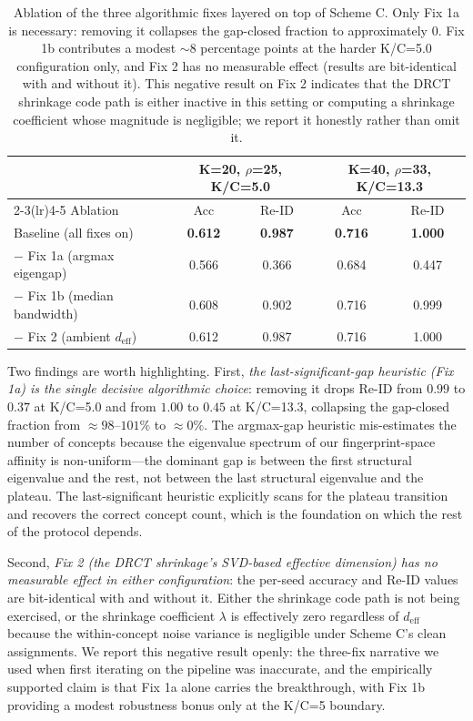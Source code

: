 \begin{table}[h]
\centering
\caption{Ablation of the three algorithmic fixes layered on top of Scheme C. Only Fix 1a is necessary: removing it collapses the gap-closed fraction to approximately $0$. Fix 1b contributes a modest $\sim 8$ percentage points at the harder K/C=5.0 configuration only, and Fix 2 has no measurable effect (results are bit-identical with and without it). This negative result on Fix 2 indicates that the DRCT shrinkage code path is either inactive in this setting or computing a shrinkage coefficient whose magnitude is negligible; we report it honestly rather than omit it.}
\label{tab:three_fix_ablation}
\small
\begin{tabular}{lcccc}
\toprule
& \multicolumn{2}{c}{K=20, $\rho$=25, K/C=5.0} & \multicolumn{2}{c}{K=40, $\rho$=33, K/C=13.3} \\
\cmidrule(lr){2-3}\cmidrule(lr){4-5}
Ablation & Acc & Re-ID & Acc & Re-ID \\
\midrule
Baseline (all fixes on) & \textbf{0.612} & \textbf{0.987} & \textbf{0.716} & \textbf{1.000} \\
$-$ Fix 1a (argmax eigengap) & 0.566 & 0.366 & 0.684 & 0.447 \\
$-$ Fix 1b (median bandwidth) & 0.608 & 0.902 & 0.716 & 0.999 \\
$-$ Fix 2 (ambient $d_{\mathrm{eff}}$) & 0.612 & 0.987 & 0.716 & 1.000 \\
\bottomrule
\end{tabular}
\end{table}

Two findings are worth highlighting. First, \emph{the last-significant-gap heuristic (Fix 1a) is the single decisive algorithmic choice}: removing it drops Re-ID from $0.99$ to $0.37$ at K/C=5.0 and from $1.00$ to $0.45$ at K/C=13.3, collapsing the gap-closed fraction from $\approx 98$--$101\%$ to $\approx 0\%$. The argmax-gap heuristic mis-estimates the number of concepts because the eigenvalue spectrum of our fingerprint-space affinity is non-uniform---the dominant gap is between the first structural eigenvalue and the rest, not between the last structural eigenvalue and the plateau. The last-significant heuristic explicitly scans for the plateau transition and recovers the correct concept count, which is the foundation on which the rest of the protocol depends.

Second, \emph{Fix 2 (the DRCT shrinkage's SVD-based effective dimension) has no measurable effect in either configuration}: the per-seed accuracy and Re-ID values are bit-identical with and without it. Either the shrinkage code path is not being exercised, or the shrinkage coefficient $\lambda$ is effectively zero regardless of $d_{\mathrm{eff}}$ because the within-concept noise variance is negligible under Scheme C's clean assignments. We report this negative result openly: the three-fix narrative we used when first iterating on the pipeline was inaccurate, and the empirically supported claim is that Fix 1a alone carries the breakthrough, with Fix 1b providing a modest robustness bonus only at the K/C=5 boundary.

